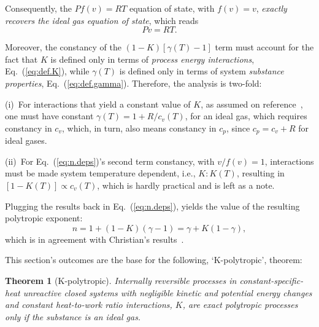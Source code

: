 \documentclass[fleqn,11pt]{SelfArx}
\newtheorem{theorem}{Theorem}
\begin{document}
    Consequently, the $Pf(v) = RT$ equation of state, with $f(v) =  v$,  \emph{exactly  recovers
    the ideal gas equation of state\/}, which reads
    \begin{equation}
        Pv = RT.
        \label{eq:ideal.gas.EoS}
    \end{equation}

    Moreover, the constancy of the $(1 - K)[\gamma(T) - 1]$ term must account for the fact  that
    $K$ is defined only in terms of \emph{process  energy  interactions},  Eq.~(\ref{eq:def.K}),
    while  $\gamma(T)$  is  defined  only  in  terms  of  system  \emph{substance   properties},
    Eq.~(\ref{eq:def.gamma}). Therefore, the analysis is two-fold:

    (i)~For   interactions   that   yield   a   constant   value   of   $K$,   as   assumed   on
    reference~\cite{2012-ChristiansJ-IntJMechEngEduc}, one must have constant $\gamma(T) =  1  +
    R/c_v(T)$, for an ideal gas, which requires constancy in $c_v$, which, in turn,  also  means
    constancy in $c_p$, since $c_p = c_v + R$ for ideal gases.

    (ii)~For Eq.~(\ref{eq:n.deps})'s second term constancy, with $v/f(v) = 1$, interactions must
    be made system temperature dependent, i.e., $K\!:\!K(T)$, resulting in $[1 -  K(T)]  \propto
    c_v(T)$, which is hardly practical and is left as a note.

    Plugging the results back in  Eq.~(\ref{eq:n.deps}),  yields  the  value  of  the  resulting
    polytropic exponent:
    \begin{equation}
        n = 1 + (1 - K)(\gamma - 1) = \gamma + K(1 - \gamma),
        \label{eq:n.final}
    \end{equation}
    \noindent        which        is        in        agreement         with         Christian's
    results~\cite{2012-ChristiansJ-IntJMechEngEduc}.

    This section's outcomes are the base for the following, `K-polytropic', theorem:

    \begin{theorem}[K-polytropic]\label{theo:K.poly}
        Internally reversible processes in constant-specific-heat unreactive closed systems with
        negligible  kinetic  and  potential  energy  changes  and  constant  heat-to-work  ratio
        interactions, $K$, are exact polytropic processes only if the substance is an ideal gas.
    \end{theorem}
\end{document}
